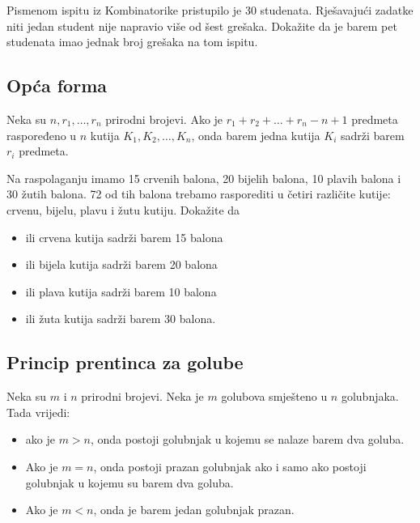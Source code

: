 \begin{problem}
    Pismenom ispitu iz Kombinatorike pristupilo je 30 studenata. Rješavajući
    zadatke niti jedan student nije napravio više od šest grešaka. Dokažite da
    je barem pet studenata imao jednak broj grešaka na tom ispitu.
\end{problem}

\subsection{Opća forma}

\begin{theorem}
    Neka su $n, r_1, \dots, r_n$ prirodni brojevi. Ako je
    $r_1+r_2+\dots+r_n-n+1$ predmeta raspoređeno u $n$ kutija $K_1, K_2, \dots,
    K_n$, onda barem jedna kutija $K_i$ sadrži barem $r_i$ predmeta.
\end{theorem}

\begin{problem}
    Na raspolaganju imamo 15 crvenih balona, 20 bijelih balona, 10 plavih balona
    i 30 žutih balona. 72 od tih balona trebamo rasporediti u četiri različite
    kutije: crvenu, bijelu, plavu i žutu kutiju. Dokažite da
    \begin{itemize}
        \item ili crvena kutija sadrži barem 15 balona
        \item ili bijela kutija sadrži barem 20 balona
        \item ili plava kutija sadrži barem 10 balona
        \item ili žuta kutija sadrži barem 30 balona.
    \end{itemize}
\end{problem}

\subsection{Princip prentinca za golube}

Neka su $m$ i $n$ prirodni brojevi. Neka je $m$ golubova smješteno u $n$
golubnjaka. Tada vrijedi:

\begin{itemize}
    \item ako je $m>n$, onda postoji golubnjak u kojemu se nalaze barem dva
    goluba.
    \item Ako je $m=n$, onda postoji prazan golubnjak ako i samo ako postoji
    golubnjak u kojemu su barem dva goluba.
    \item Ako je $m<n$, onda je barem jedan golubnjak prazan.
\end{itemize}

